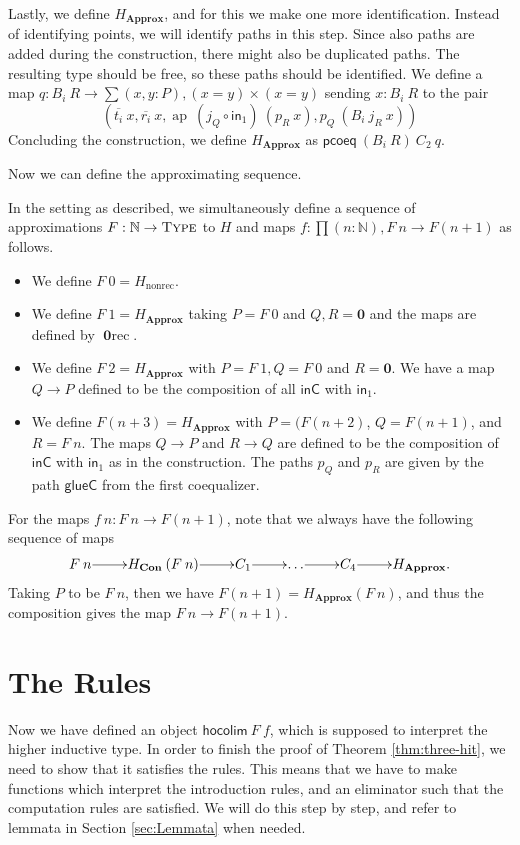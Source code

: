 \documentclass[a4paper,UKenglish]{lipics-v2016}
\newcommand{\Boperator}[1]{\mathsf{#1}}
\newcommand{\inn}{\Boperator{in}}
\newcommand{\zero}[0]{\textbf{0}}
\newcommand{\frec}[0]{\!\operatorname{rec}}
\newcommand{\nonrec}[0]{\operatorname{nonrec}}
\newcommand{\ap}[0]{\operatorname{ap}}
\newcommand{\Con}[0]{\textbf{Con}}
\newcommand{\Approx}[0]{\textbf{Approx}}
\newcommand{\inC}[0]{\Boperator{inC}}
\newcommand{\glueC}[0]{\Boperator{glueC}}
\newcommand{\pcoeq}[0]{\Boperator{pcoeq}}
\newcommand{\hocolim}[0]{\Boperator{hocolim}}
\newcommand{\Type}[0]{\operatorname{\textsc{Type}}}
\begin{document}
Lastly, we define $H_\Approx$, and for this we make one more identification.
Instead of identifying points, we will identify paths in this step.
Since also paths are added during the construction, there might also be duplicated paths.
The resulting type should be free, so these paths should be identified.
We define a map $q : B_i \> R \rightarrow \sum (x, y : P), (x = y) \times (x = y)$ sending $x : B_i \> R$ to the pair
\[
(\overline{t_i} \> x, \overline{r_i} \> x, \ap \> (j_Q \circ \inn_1) \> (p_R \> x), p_Q \> (B_i \> j_R \> x))
\]
Concluding the construction, we define $H_{\Approx}$ as $\pcoeq \> (B_i \> R) \> C_2 \> q$.

Now we can define the approximating sequence.

\begin{definition}
In the setting as described, we simultaneously define a sequence of approximations $F : \mathbb{N} \rightarrow \Type$ to $H$ and maps $f : \prod(n : \mathbb{N}), F \> n \rightarrow F(n+1)$ as follows.
\begin{itemize}
        \item We define $F \> 0 = H_{\nonrec}$.
        \item We define $F \> 1 = H_{\Approx}$ taking $P = F \> 0$ and $Q, R = \zero$ and the maps are defined by $\zero\frec$.
        \item We define $F \> 2 = H_{\Approx}$ with $P= F \> 1, Q = F \> 0$ and $R =\zero$. We have a map $Q \rightarrow P$ defined to be the composition of all $\inC$ with $\inn_1$.
        \item We define $F(n+3) = H_{\Approx}$ with $P = (F(n+2)$, $Q = F(n+1)$, and $R = F \> n$. The maps $Q \rightarrow P$ and $R \rightarrow Q$ are defined to be the composition of $\inC$ with $\inn_1$ as in the construction. The paths $p_Q$ and $p_R$ are given by the path $\glueC$ from the first coequalizer.
\end{itemize}
For the maps $f \> n : F \> n \rightarrow F(n + 1)$, note that we always have the following sequence of maps
\[
\xymatrix@1
{
        F \> n \ar[r] & H_{\Con} \> (F \> n) \ar[r] & C_1 \ar[r] & \ldots \ar[r] & C_4 \ar[r] & H_{\Approx}.
}
\]
Taking $P$ to be $F \> n$, then we have $F (n+1) = H_{\Approx} (F \> n)$, and thus the composition gives the map $F \> n \rightarrow F(n + 1)$.
\end{definition}

\section{The Rules}
\label{sec:rules}
Now we have defined an object $\hocolim \> F \> f$, which is supposed to interpret the higher inductive type.
In order to finish the proof of Theorem \ref{thm:three-hit}, we need to show that it satisfies the rules.
This means that we have to make functions which interpret the introduction rules, and an eliminator such that the computation rules are satisfied.
We will do this step by step, and refer to lemmata in Section \ref{sec:Lemmata} when needed.
\end{document}
